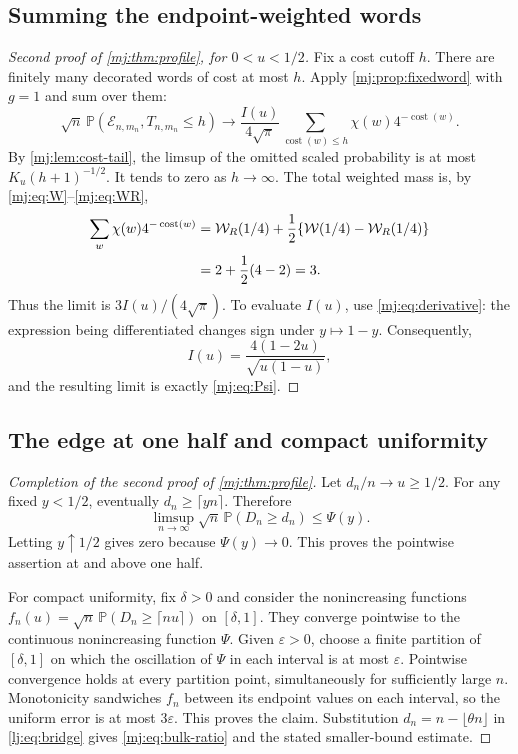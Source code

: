 \documentclass[11pt,a4paper]{article}
\theoremstyle{definition}\newaliascnt{definition}{theorem}
\theoremstyle{remark}\newaliascnt{remark}{theorem}
\newcommand{\eps}{\varepsilon}
\newcommand{\ljP}{\mathbb P}
\newcommand{\ljcost}{\operatorname{cost}}
\begin{document}
\subsection{Summing the endpoint-weighted words}
\begin{proof}[Second proof of \cref{mj:thm:profile}, for $0<u<1/2$]
Fix a cost cutoff $h$. There are finitely many decorated words of cost at
most $h$. Apply \cref{mj:prop:fixedword} with $g=1$ and sum over them:
\[
 \sqrt n\,\ljP(\mathcal E_{n,m_n},T_{n,m_n}\le h)
 \longrightarrow\frac{I(u)}{4\sqrt\pi}
       \sum_{\ljcost(w)\le h}\chi(w)4^{-\ljcost(w)}.
\]
By \cref{mj:lem:cost-tail}, the limsup of the omitted scaled probability is
at most $K_u(h+1)^{-1/2}$. It tends to zero as $h\to\infty$. The total
weighted mass is, by \eqref{mj:eq:W}--\eqref{mj:eq:WR},
\begin{align}
 \sum_w\chi(w)4^{-\ljcost(w)}
 &=\mathcal W_R(1/4)+\frac12\{\mathcal W(1/4)-\mathcal W_R(1/4)\}\notag\\
 &=2+\frac12(4-2)=3.
 \label{mj:eq:wordmass}
\end{align}
Thus the limit is $3I(u)/(4\sqrt\pi)$. To evaluate $I(u)$, use
\eqref{mj:eq:derivative}: the expression being differentiated changes sign
under $y\mapsto1-y$. Consequently,
\begin{equation}
 I(u)=\frac{4(1-2u)}{\sqrt{u(1-u)}},
 \label{mj:eq:I}
\end{equation}
and the resulting limit is exactly \eqref{mj:eq:Psi}.
\end{proof}

\subsection{The edge at one half and compact uniformity}
\begin{proof}[Completion of the second proof of \cref{mj:thm:profile}]
Let $d_n/n\to u\ge1/2$. For any fixed $y<1/2$, eventually
$d_n\ge\lceil yn\rceil$. Therefore
\[
 \limsup_{n\to\infty}\sqrt n\,\ljP(D_n\ge d_n)\le\Psi(y).
\]
Letting $y\uparrow1/2$ gives zero because $\Psi(y)\to0$. This proves the
pointwise assertion at and above one half.

For compact uniformity, fix $\delta>0$ and consider the nonincreasing
functions $f_n(u)=\sqrt n\,\ljP(D_n\ge\lceil nu\rceil)$ on $[\delta,1]$. They
converge pointwise to the continuous nonincreasing function $\Psi$. Given
$\eps>0$, choose a finite partition of $[\delta,1]$ on which the oscillation
of $\Psi$ in each interval is at most $\eps$. Pointwise convergence holds at
every partition point, simultaneously for sufficiently large $n$.
Monotonicity sandwiches $f_n$ between its endpoint values on each interval,
so the uniform error is at most $3\eps$. This proves the claim. Substitution
$d_n=n-\lfloor\theta n\rfloor$ in \eqref{lj:eq:bridge} gives
\eqref{mj:eq:bulk-ratio} and the stated smaller-bound estimate.
\end{proof}
\end{document}

